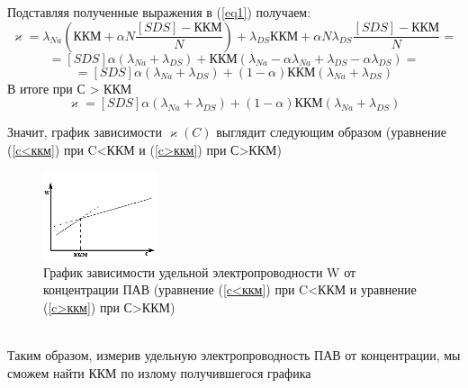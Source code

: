 \documentclass[a4paper,12pt]{article}
\begin{document}
\begin{itemize}
Подставляя полученные выражения в (\ref{eq1}) получаем:
 \begin{equation*}
    \varkappa = \lambda_{Na} (\text{ККМ} + \alpha N \frac{[SDS] - \text{ККМ}}{N}) +  \lambda_{DS} \text{ККМ} + \alpha N \lambda_{DS} \frac{[SDS] - \text{ККМ}}{N} =
\end{equation*}
\begin{equation*}
    = [SDS]\alpha(\lambda_{Na} + \lambda_{DS}) + \text{ККМ} (\lambda_{Na} - \alpha \lambda_{Na} + \lambda_{DS} - \alpha \lambda_{DS}) = 
\end{equation*}
\begin{equation*}
    = [SDS]\alpha(\lambda_{Na} + \lambda_{DS}) + (1 - \alpha)\text{ККМ}(\lambda_{Na} + \lambda_{DS})
\end{equation*}
В итоге при С > ККМ
\begin{equation}\label{c>ккм}
    \varkappa = [SDS]\alpha(\lambda_{Na} + \lambda_{DS}) + (1 - \alpha)\text{ККМ}(\lambda_{Na} + \lambda_{DS})
\end{equation}
\end{itemize}
Значит, график зависимости $\varkappa(C)$ выглядит следующим образом (уравнение (\ref{c<ккм}) при C<ККМ и  (\ref{c>ккм}) при С>ККМ)\\
\begin{figure}[h!]
    \centering
    \includegraphics[width = 0.3\textwidth]{cele.png}
    \caption{График зависимости удельной электропроводности W от концентрации ПАВ (уравнение (\ref{c<ккм}) при C<ККМ и уравнение (\ref{c>ккм}) при С>ККМ)}
    \label{fig:no_int}
\end{figure}\\
Таким образом, измерив удельную электропроводность ПАВ от концентрации, мы сможем найти ККМ по излому получившегося графика
\end{document}
